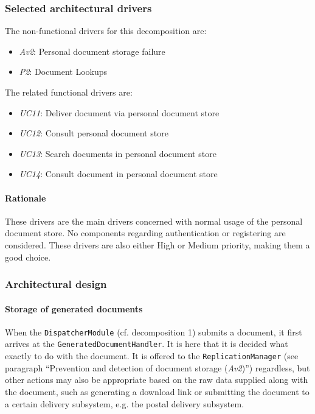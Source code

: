 \documentclass[a4paper,10pt]{article}
\begin{document}
\subsubsection{Selected architectural drivers}
The non-functional drivers for this decomposition are:

\begin{itemize}
    \item \emph{Av2}: Personal document storage failure
    \item \emph{P2}: Document Lookups
\end{itemize}

The related functional drivers are:

\begin{itemize}
    \item \emph{UC11}: Deliver document via personal document store
    \item \emph{UC12}: Consult personal document store
    \item \emph{UC13}: Search documents in personal document store
    \item \emph{UC14}: Consult document in personal document store
\end{itemize}

\paragraph{Rationale}
These drivers are the main drivers concerned with normal usage of the personal document store. No components regarding authentication or registering are considered. These drivers are also either High or Medium priority, making them a good choice.

\subsubsection{Architectural design}

\paragraph{Storage of generated documents}
When the \texttt{DispatcherModule} (cf. decomposition 1) submits a document, it first arrives at the \texttt{GeneratedDocumentHandler}. It is here that it is decided what exactly to do with the document. It is offered to the \texttt{ReplicationManager} (see paragraph ``Prevention and detection of document storage (\emph{Av2})'') regardless, but other actions may also be appropriate based on the raw data supplied along with the document, such as generating a download link or submitting the document to a certain delivery subsystem, e.g. the postal delivery subsystem.
\end{document}
